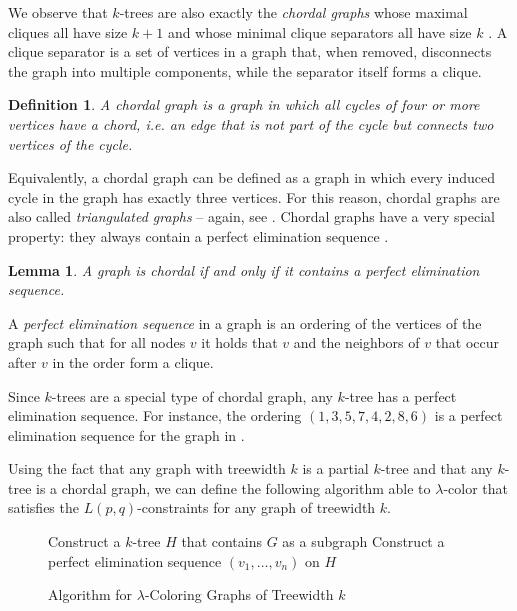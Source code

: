 \documentclass[12pt,a4paper]{article}
\newtheorem{definition}{Definition}
\newtheorem{lemma}{Lemma}
\begin{document}
	We observe that $k$-trees are also exactly the \textit{chordal graphs} whose maximal cliques all have size $k+1$ and whose minimal clique separators all have size $k$ \cite{k_trees_chordal}. A clique separator is a set of vertices in a graph that, when removed, disconnects the graph into multiple components, while the separator itself forms a clique.

	\begin{definition}
		A chordal graph is a graph in which all cycles of four or more vertices have a chord, i.e. an edge that is not part of the cycle but connects two vertices of the cycle.
	\end{definition}

	Equivalently, a chordal graph can be defined as a graph in which every induced cycle in the graph has exactly three vertices. For this reason, chordal graphs are also called \textit{triangulated graphs} -- again, see . Chordal graphs have a very special property: they always contain a perfect elimination sequence \cite{ordering}.

	\begin{lemma}
		A graph is chordal if and only if it contains a perfect elimination sequence.
	\end{lemma}

	A \textit{perfect elimination sequence} in a graph is an ordering of the vertices of the graph such that for all nodes $v$ it holds that $v$ and the neighbors of $v$ that occur after $v$ in the order form a clique.
	
	Since $k$-trees are a special type of chordal graph, any $k$-tree has a perfect elimination sequence. For instance, the ordering  $(1,3,5,7,4,2,8,6)$ is a perfect elimination sequence for the graph in .

	Using the fact that any graph with treewidth $k$ is a partial $k$-tree and that any $k$-tree is a chordal graph, we can define the following algorithm able to $\lambda$-color that satisfies the $L(p,q)$-constraints for any graph of treewidth $k$.

	\begin{figure}[H]
		\begin{algorithmic}[1]
				\State Construct a $k$-tree $H$ that contains $G$ as a subgraph
				\State Construct a perfect elimination sequence $(v_1, \ldots, v_n)$ on $H$
				\EndFor
			\EndFunction
		\end{algorithmic}

		\caption{Algorithm for $\lambda$-Coloring Graphs of Treewidth $k$}
	\end{figure}
\end{document}
